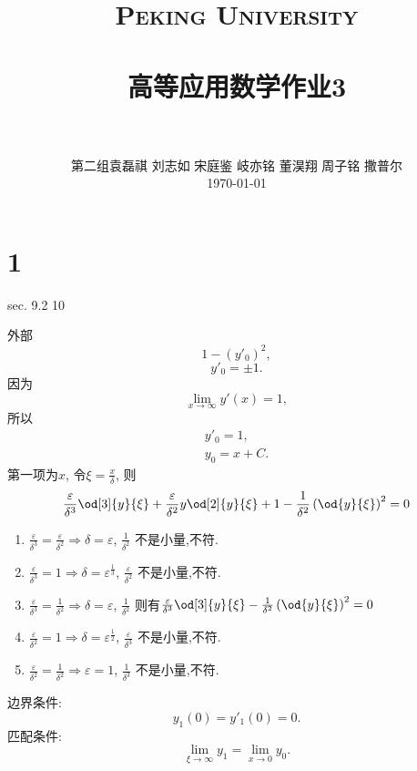 \documentclass[12pt]{article}
\title{
		\vspace{-1in} 	
		\usefont{OT1}{bch}{b}{n}
		\normalfont \normalsize \textsc{\LARGE Peking University}\\[1cm] %
		\horrule{0.5pt} \\[0.5cm]
		\huge \bfseries{高等应用数学作业3} \\
		\horrule{2pt} \\[0.5cm]
}
\author{
		\normalfont 								\normalsize
		第二组\quad 袁磊祺 \quad 刘志如 \quad 宋庭鉴 \quad 岐亦铭 \quad 董淏翔 \quad 周子铭 \quad 撒普尔\\	\normalsize
        \today
}
\date{}
\begin{document}


\maketitle

\section{1}

sec. 9.2 10

外部
\begin{equation}
	1 - (y'_0)^2,
\end{equation}
\begin{equation}
	y'_0 = \pm 1.
\end{equation}
因为
\begin{equation}
	\lim_{x\to \infty} y'(x) = 1,
\end{equation}
所以
\begin{gather}
	y'_0 = 1,\\
	y_0 = x + C.
\end{gather}
第一项为$x$, 令$\xi = \frac{x}{\delta}$, 则
\begin{equation}
	\frac{\varepsilon}{\delta^3} \od[3]{y}{\xi} + \frac{\varepsilon}{\delta^2} y \od[2]{y}{\xi} + 1 - \frac{1}{\delta^2} \left(\od{y}{\xi}\right)^2 = 0
\end{equation}

\begin{enumerate}
	\item $\frac{\varepsilon}{\delta^3} = \frac{\varepsilon}{\delta^2} \Rightarrow \delta = \varepsilon$, $\frac{1}{\delta^2}$ 不是小量,不符.
	\item $\frac{\varepsilon}{\delta^3} = 1 \Rightarrow \delta = \varepsilon^{\frac{1}{3}}$, $\frac{\varepsilon}{\delta^2}$ 不是小量,不符.
	\item $\frac{\varepsilon}{\delta^3} = \frac{1}{\delta^2} \Rightarrow \delta = \varepsilon$, $\frac{1}{\delta^2}$ 则有$\frac{\varepsilon}{\delta^3} \od[3]{y}{\xi} - \frac{1}{\delta^2} \left(\od{y}{\xi}\right)^2 = 0$
	\item $\frac{\varepsilon}{\delta^2} = 1 \Rightarrow \delta = \varepsilon^{\frac{1}{2}}$, $\frac{\varepsilon}{\delta^3}$ 不是小量,不符.
	\item $\frac{\varepsilon}{\delta^2} = \frac{1}{\delta^2} \Rightarrow \varepsilon = 1$, $\frac{1}{\delta^3}$ 不是小量,不符.
\end{enumerate}
边界条件:
\begin{equation}
	y_1(0) = y'_1(0) = 0.
\end{equation}
匹配条件:
\begin{equation}
	\lim_{\xi \to \infty} y_1 = \lim_{x \to 0} y_0.
\end{equation}
\end{document}

